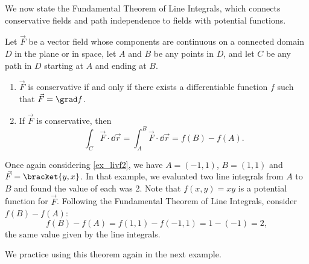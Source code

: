 We now state the Fundamental Theorem of Line Integrals, which connects conservative fields and path independence to fields with potential functions. 

\begin{theorem}\label{thm:FTofLineIntegrals}%
Let $\vec F$ be a vector field whose components are continuous on a connected domain $D$ in the plane or in space, let $A$ and $B$ be any points in $D$, and let $C$ be any path in $D$ starting at $A$ and ending at $B$.
\begin{enumerate}
	\item $\vec F$ is conservative if and only if there exists a differentiable function $f$ such that $\vec F = \grad f$. 
	\item	If $\vec F$ is conservative, then 
	\[\int_C\vec F\cdot\dd\vec r = \int_A^B \vec F\cdot\dd\vec r = f(B) - f(A).\]
\end{enumerate}
\end{theorem}

Once again considering \autoref{ex_livf2}, we have $A = (-1,1)$, $B = (1,1)$ and $\vec F =\bracket{y,x}$. In that example, we evaluated two line integrals from $A$ to $B$ and found the value of each was 2. Note that $f(x,y) = xy$ is a potential function for $\vec F$. Following the Fundamental Theorem of Line Integrals, consider $f(B) - f(A)$:
\[f(B) - f(A) = f(1,1) - f(-1,1) = 1 - (-1) = 2,\]
the same value given by the line integrals.


We practice using this theorem again in the next example.

